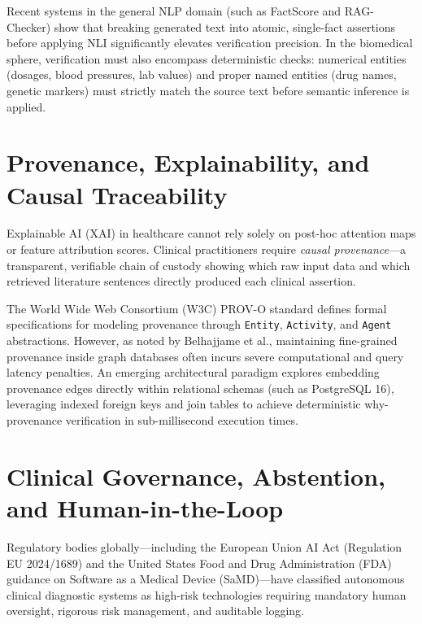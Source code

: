 \documentclass[12pt,a4paper]{report}
\begin{document}
Recent systems in the general NLP domain (such as FactScore and RAG-Checker) show that breaking generated text into atomic, single-fact assertions before applying NLI significantly elevates verification precision. In the biomedical sphere, verification must also encompass deterministic checks: numerical entities (dosages, blood pressures, lab values) and proper named entities (drug names, genetic markers) must strictly match the source text before semantic inference is applied.

\section{Provenance, Explainability, and Causal Traceability}
Explainable AI (XAI) in healthcare cannot rely solely on post-hoc attention maps or feature attribution scores. Clinical practitioners require \textit{causal provenance}---a transparent, verifiable chain of custody showing which raw input data and which retrieved literature sentences directly produced each clinical assertion.

The World Wide Web Consortium (W3C) PROV-O standard defines formal specifications for modeling provenance through \texttt{Entity}, \texttt{Activity}, and \texttt{Agent} abstractions. However, as noted by Belhajjame et al., maintaining fine-grained provenance inside graph databases often incurs severe computational and query latency penalties. An emerging architectural paradigm explores embedding provenance edges directly within relational schemas (such as PostgreSQL 16), leveraging indexed foreign keys and join tables to achieve deterministic why-provenance verification in sub-millisecond execution times.

\section{Clinical Governance, Abstention, and Human-in-the-Loop}
Regulatory bodies globally---including the European Union AI Act (Regulation EU 2024/1689) and the United States Food and Drug Administration (FDA) guidance on Software as a Medical Device (SaMD)---have classified autonomous clinical diagnostic systems as high-risk technologies requiring mandatory human oversight, rigorous risk management, and auditable logging.
\end{document}
